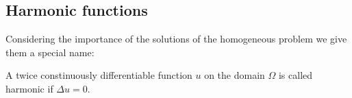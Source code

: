 \subsection{Harmonic functions}
Considering the importance of the solutions of the homogeneous problem
we give them a special name:

\begin{definition}
A twice constinuously differentiable function $u$ on the domain $\Omega$
is called harmonic if $\Delta u=0$.
\end{definition}


